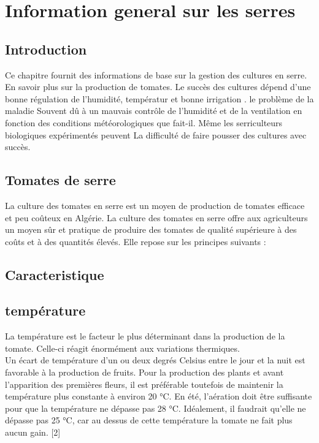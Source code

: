 \chapter{Information general sur les serres } \label{chap:Information general sur les serres}

\section*{Introduction}
Ce chapitre fournit des informations de base sur la gestion des cultures en serre.
En savoir plus sur la production de tomates. 
Le succès des cultures dépend d'une bonne régulation de l'humidité,
 températur et bonne irrigation . le problème de la maladie 
 Souvent dû à un mauvais contrôle de l'humidité et de la ventilation en fonction des conditions météorologiques 
 que fait-il. Même les serriculteurs biologiques expérimentés peuvent 
 La difficulté de faire pousser des cultures avec succès.
 \\
\section*{Tomates de serre }
La culture des tomates en serre est un moyen de production de tomates efficace et peu coûteux en Algérie. La culture des tomates en serre offre aux agriculteurs un moyen sûr et pratique de produire des tomates de qualité supérieure à des coûts et à des quantités élevés.
Elle repose sur les principes suivants :
\section*{Caracteristique}
\section{température}
La température est le facteur le plus déterminant dans la production de la tomate. Celle-ci réagit énormément aux variations thermiques.
\\
Un écart de température d'un ou deux degrés Celsius entre le jour et la nuit est favorable à la production de fruits. Pour la production des plants et avant l'apparition des premières fleurs, il est préférable toutefois de maintenir la température plus constante à environ 20 °C. En été, l'aération doit être suffisante pour que la température ne dépasse pas 28 °C. Idéalement, il faudrait qu'elle ne dépasse pas 25 °C, car au dessus de cette température la tomate ne fait plus aucun gain. [2]
\\
